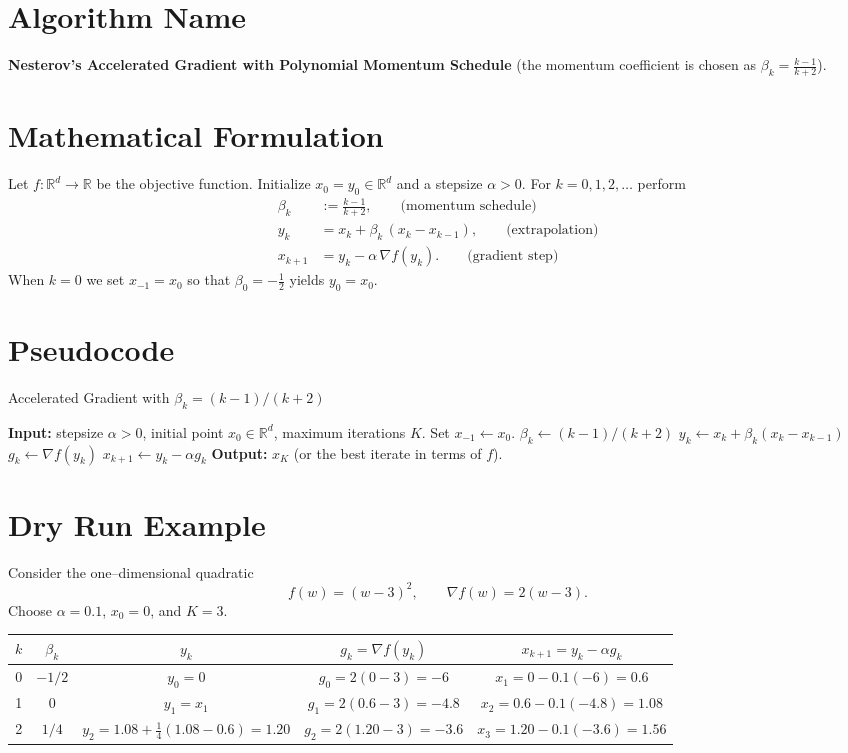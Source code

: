 \documentclass{article}
\newcommand{\grad}{\nabla}
\newcommand{\R}{\mathbb{R}}
\begin{document}
\section*{Algorithm Name}
\textbf{Nesterov’s Accelerated Gradient with Polynomial Momentum Schedule}  
(the momentum coefficient is chosen as $\displaystyle \beta_k=\frac{k-1}{k+2}$).

\section*{Mathematical Formulation}
Let $f:\R^d\rightarrow\R$ be the objective function.  
Initialize $x_{0}=y_{0}\in\R^{d}$ and a stepsize $\alpha>0$.  
For $k=0,1,2,\dots$ perform
\begin{align}
    \beta_k &:= \frac{k-1}{k+2},\qquad\text{(momentum schedule)}\label{eq:beta}\\[4pt]
    y_k    &= x_k + \beta_k\,(x_k-x_{k-1}),\qquad\text{(extrapolation)}\label{eq:y}\\[4pt]
    x_{k+1}&= y_k - \alpha\,\grad f(y_k).\qquad\text{(gradient step)}\label{eq:x}
\end{align}
When $k=0$ we set $x_{-1}=x_0$ so that $\beta_0= -\frac{1}{2}$ yields $y_0=x_0$.

\section*{Pseudocode}
\begin{algorithm}[H]
\caption{Accelerated Gradient with $\beta_k=(k-1)/(k+2)$}
\begin{algorithmic}[1]
\STATE \textbf{Input:} stepsize $\alpha>0$, initial point $x_0\in\R^d$, maximum iterations $K$.
\STATE Set $x_{-1}\gets x_0$.
    \STATE $\beta_k \gets (k-1)/(k+2)$
    \STATE $y_k \gets x_k + \beta_k (x_k - x_{k-1})$
    \STATE $g_k \gets \grad f(y_k)$
    \STATE $x_{k+1} \gets y_k - \alpha g_k$
\ENDFOR
\STATE \textbf{Output:} $x_K$ (or the best iterate in terms of $f$).
\end{algorithmic}
\end{algorithm}

\section*{Dry Run Example}
Consider the one–dimensional quadratic
\[
f(w) = (w-3)^2, \qquad \grad f(w)=2(w-3).
\]
Choose $\alpha=0.1$, $x_0=0$, and $K=3$.

\begin{tabular}{c|c|c|c|c}
$k$ & $\beta_k$ & $y_k$ & $g_k=\grad f(y_k)$ & $x_{k+1}=y_k-\alpha g_k$ \\ \hline
0 & $-1/2$ & $y_0 = 0$ & $g_0 = 2(0-3)=-6$ & $x_1 = 0 -0.1(-6)=0.6$ \\[4pt]
1 & $0$   & $y_1 = x_1$ & $g_1 = 2(0.6-3)=-4.8$ & $x_2 = 0.6 -0.1(-4.8)=1.08$ \\[4pt]
2 & $1/4$ & $y_2 = 1.08 + \tfrac14(1.08-0.6)=1.20$ &
$g_2 = 2(1.20-3)=-3.6$ & $x_3 = 1.20-0.1(-3.6)=1.56$
\end{tabular}
\end{document}
